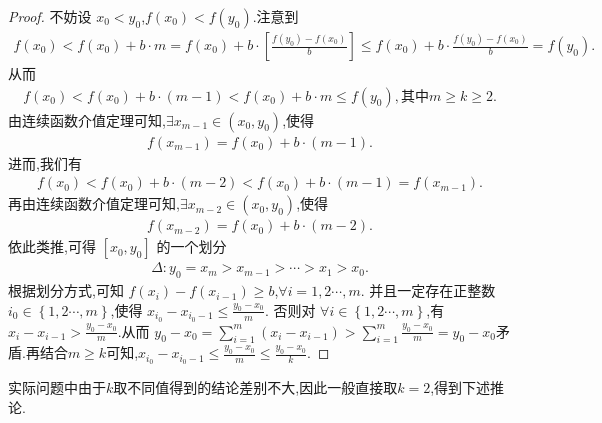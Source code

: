 \documentclass[lang=cn,newtx,10pt,scheme=chinese]{../Template/elegantbook}
\begin{document}
\begin{proof}
    不妨设 \(x_0<y_0\),\(f\left( x_0 \right) <f\left( y_0 \right)\).注意到 
    \begin{align*}
        f\left( x_0 \right) <f\left( x_0 \right) + b\cdot m = f\left( x_0 \right) + b\cdot \left[ \frac{f\left( y_0 \right) -f\left( x_0 \right)}{b} \right] \leqslant  f\left( x_0 \right) + b\cdot \frac{f\left( y_0 \right) -f\left( x_0 \right)}{b}=f\left( y_0 \right).
    \end{align*}
从而 
\begin{align*}
    f\left( x_0 \right) <f\left( x_0 \right) + b\cdot \left( m - 1 \right) <f\left( x_0 \right) + b\cdot m\leqslant  f\left( y_0 \right),\text{其中}m\geqslant  k\geqslant  2.
\end{align*}
由连续函数介值定理可知,\(\exists x_{m - 1}\in \left( x_0,y_0 \right)\),使得 
\begin{align*}
    f\left( x_{m - 1} \right) = f\left( x_0 \right) + b\cdot \left( m - 1 \right).
\end{align*}
进而,我们有 
\begin{align*}
    f\left( x_0 \right) <f\left( x_0 \right) + b\cdot \left( m - 2 \right) <f\left( x_0 \right) + b\cdot \left( m - 1 \right) = f\left( x_{m - 1} \right).
\end{align*}
再由连续函数介值定理可知,\(\exists x_{m - 2}\in \left( x_0,y_0 \right)\),使得
\begin{align*}
   f\left( x_{m - 2} \right) = f\left( x_0 \right) + b\cdot \left( m - 2 \right).
\end{align*}
依此类推,可得 \(\left[ x_0,y_0 \right]\) 的一个划分 
\begin{align*}
    \Delta :y_0=x_m>x_{m - 1}>\cdots >x_1>x_0.
\end{align*}
根据划分方式,可知 \(f\left( x_i \right) - f\left( x_{i - 1} \right) \geqslant  b\),\(\forall i = 1,2\cdots,m\).
并且一定存在正整数 \(i_0\in \left\{ 1,2\cdots,m \right\}\),使得 \(x_{i_0}-x_{i_0 - 1}\leqslant  \frac{y_0 - x_0}{m}\).
否则对 \(\forall i\in \left\{ 1,2\cdots,m \right\}\),有 \(x_i - x_{i - 1}>\frac{y_0 - x_0}{m}\).从而 \(y_0 - x_0=\sum_{i = 1}^m{\left( x_i - x_{i - 1} \right)}>\sum_{i = 1}^m{\frac{y_0 - x_0}{m}} = y_0 - x_0\)矛盾.再结合$m\geqslant k$可知,\(x_{i_0}-x_{i_0 - 1}\leqslant  \frac{y_0 - x_0}{m}\leqslant  \frac{y_0 - x_0}{k}\).

\end{proof}
\begin{remark}
    实际问题中由于$k$取不同值得到的结论差别不大,因此一般直接取$k=2$,得到下述推论. 
\end{remark}
\end{document}
